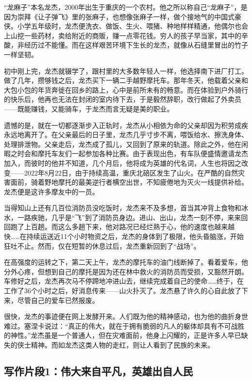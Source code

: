 “龙麻子”本名龙杰，2000年出生于重庆的一个农村。他之所以称自己“龙麻子”，是因为崇拜《让子弹飞》里的张麻子，也想像张麻子一样，做个接地气的中国式豪侠。小学五年级时，龙杰便洗衣、做饭、生火、喂猪、种地样样精通，他偶尔也会上山挖一些药材，卖给附近的商贩，赚一点零花钱。穷人的孩子早当家，其中的辛酸，非经历过不能懂。而在这样艰苦环境下生长的龙杰，就像从石缝里冒出的竹子一样坚韧。

初中刚上完，龙杰就辍学了，跟村里的大多数年轻人一样，他选择南下进厂打工。做了几年，攒够钱之后，龙杰买下一辆二手越野摩托车。那年冬天，他载着父亲和大包小包的年货奔徙在回乡的路上，心中是前所未有的畅意。而在体验到户外骑行的快乐后，他再也无法在封闭的室内待下去，于是毅然辞职，改行做起了外卖员——既能赚钱，又能骑车，于龙杰而言无疑是美的职业。

遗憾的是，就在一切都逐渐步入正轨时，龙杰从小相依为命的父亲却因为积劳成疾永远地离开了。在父亲最后的日子里，龙杰几乎寸步不离，喂饭给水、擦洗身体、处理排泄物。父亲走后，龙杰成了孤儿，又回到了原来的轨道。除此之外，他在闲暇之时会和摩托车友们一起参加各种比赛。由于表现出色，有车队便盛情邀请龙杰加入，而彼时的他并不知道，几个月后，他将成为英雄的代名词，人生也将因之改变——2022年8月22日，由于持续高温，重庆北碚区发生了山火。在严酷的自然灾害面前，骑着野地摩托的最美逆行者横空出世，不知疲倦地为灭火一线提供补给。龙杰便是这许多摩友中的一员。

当得知山上还有几百位消防员没吃饭时，龙杰来不及多想，首当其冲背上食物和冰水，一路疾驰，几乎是“飞”到了消防员身边。进山、出山，龙杰一刻不停，来来回回跑了上百趟。而这么多趟下来，他对路况已经烂熟于心，他的速度也越来越快……在持续运送近11个小时物资之后，龙杰的身体到了极限，他头昏脑涨，开始狂吐不止。然而，仅在短暂的休息过后，龙杰重新回到了“战场”。

在高强度的运转之下，第二天上午，龙杰的摩托车的油门线断掉了。看着爱车，他分外心疼，但想到自己的摩托是因为还在林中救火的消防员而受损，又豁然开朗。车修好之后，龙杰再次马不停蹄地冲进山去，继续完成着自己的使命……终于，在工作了36个小时之后，好消息传来——山火扑灭了。龙杰悬了许久的心自此放了下来，尽管自己的爱车已然报废。

很快，龙杰的事迹便在网上发酵开来。人们既为他的精神感动，也为他的曲折身世难过。塞涅卡说过：“真正的伟大，就在于拥有脆弱的凡人的躯体却具有不可战胜的神性。”龙杰虽是一个普通人，但在灾难面前，他身上闪耀的，正是许多人早已缺失的侠士精神。而如龙杰这类人物的走红，则让人看到了民族的未来。

\subsection*{写作片段1：伟大来自平凡，英雄出自人民}

